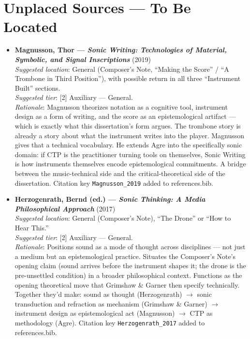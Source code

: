 \section*{Unplaced Sources — To Be Located}


\begin{itemize}

    \item \textbf{Magnusson, Thor — \textit{Sonic Writing: Technologies of Material, Symbolic, and Signal Inscriptions}} (2019) \parencite{Magnusson_2019}\\
    \textit{Suggested location}: General (Composer's Note, ``Making the Score'' / ``A Trombone in Third Position''), with possible return in all three ``Instrument Built'' sections.\\
    \textit{Suggested tier}: [2] Auxiliary — General.\\
    \textit{Rationale}: Magnusson theorizes notation as a cognitive tool, instrument design as a form of writing, and the score as an epistemological artifact — which is exactly what this dissertation's form argues. The trombone story is already a story about what the instrument writes into the player. Magnusson gives that a technical vocabulary. He extends Agre into the specifically sonic domain: if CTP is the practitioner turning tools on themselves, Sonic Writing is how instruments themselves encode epistemological commitments. A bridge between the music-technical side and the critical-theoretical side of the dissertation. Citation key \texttt{Magnusson\_2019} added to references.bib.

    \item \textbf{Herzogenrath, Bernd (ed.) — \textit{Sonic Thinking: A Media Philosophical Approach}} (2017) \parencite{Herzogenrath_2017}\\
    \textit{Suggested location}: General (Composer's Note), ``The Drone'' or ``How to Hear This.''\\
    \textit{Suggested tier}: [2] Auxiliary — General.\\
    \textit{Rationale}: Positions sound as a mode of thought across disciplines — not just a medium but an epistemological practice. Situates the Composer's Note's opening claim (sound arrives before the instrument shapes it; the drone is the pre-unsettled condition) in a broader philosophical context. Functions as the opening theoretical move that Grimshaw \& Garner then specify technically. Together they'd make: sound as thought (Herzogenrath) $\to$ sonic transduction and refraction as mechanism (Grimshaw \& Garner) $\to$ instrument design as epistemological act (Magnusson) $\to$ CTP as methodology (Agre). Citation key \texttt{Herzogenrath\_2017} added to references.bib.


\end{itemize}

